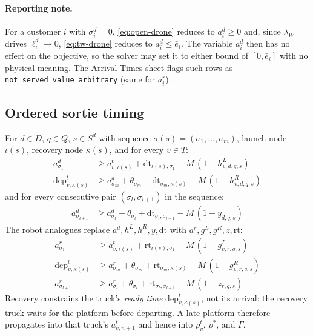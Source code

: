 \documentclass[10pt]{article}
\begin{document}
\paragraph{Reporting note.} For a customer $i$ with $\sigma^d_i=0$,
\eqref{eq:open-drone} reduces to $a^d_i\ge 0$ and, since $\lambda_W$ drives
$\ell^d_i\to 0$, \eqref{eq:tw-drone} reduces to $a^d_i\le \bar{e}_i$. The variable
$a^d_i$ then has no effect on the objective, so the solver may set it to either
bound of $[0,\bar{e}_i]$ with no physical meaning. The Arrival Times sheet flags such
rows as \texttt{not\_served\_value\_arbitrary} (same for $a^r_i$).

\subsection{Ordered sortie timing}
\label{sec:sortie-time}
For $d\in D$, $q\in Q$, $s\in S^d$ with sequence $\sigma(s)=(\sigma_1,\dots,\sigma_m)$,
launch node $\iota(s)$, recovery node $\kappa(s)$, and for every $v\in T$:
\begin{align}
a^d_{\sigma_1} &\ge a^t_{v,\iota(s)} + \mathrm{dt}_{\iota(s),\sigma_1} - M\,(1-h^L_{v,d,q,s}) \label{eq:sortie-drone-launch}\\
\mathrm{dep}^t_{v,\kappa(s)} &\ge a^d_{\sigma_m} + \theta_{\sigma_m} + \mathrm{dt}_{\sigma_m,\kappa(s)} - M\,(1-h^R_{v,d,q,s}) \label{eq:sortie-drone-recover}
\end{align}
and for every consecutive pair $(\sigma_l,\sigma_{l+1})$ in the sequence:
\begin{align}
a^d_{\sigma_{l+1}} &\ge a^d_{\sigma_l} + \theta_{\sigma_l} + \mathrm{dt}_{\sigma_l,\sigma_{l+1}} - M\,(1-y_{d,q,s}) \label{eq:sortie-drone-seq}
\end{align}
The robot analogues replace $a^d, h^L, h^R, y, \mathrm{dt}$ with $a^r, g^L, g^R, z,
\mathrm{rt}$:
\begin{align}
a^r_{\sigma_1} &\ge a^t_{v,\iota(s)} + \mathrm{rt}_{\iota(s),\sigma_1} - M\,(1-g^L_{v,r,q,s}) \label{eq:sortie-robot-launch}\\
\mathrm{dep}^t_{v,\kappa(s)} &\ge a^r_{\sigma_m} + \theta_{\sigma_m} + \mathrm{rt}_{\sigma_m,\kappa(s)} - M\,(1-g^R_{v,r,q,s}) \label{eq:sortie-robot-recover}\\
a^r_{\sigma_{l+1}} &\ge a^r_{\sigma_l} + \theta_{\sigma_l} + \mathrm{rt}_{\sigma_l,\sigma_{l+1}} - M\,(1-z_{r,q,s}) \label{eq:sortie-robot-seq}
\end{align}
\noindent Recovery constrains the truck's \emph{ready time}
$\mathrm{dep}^t_{v,\kappa(s)}$, not its arrival: the recovery truck waits for
the platform before departing. A late platform therefore propagates into that
truck's $a^t_{v,n+1}$ and hence into $\rho^t_v$, $\rho^*$, and $\Gamma$.
\end{document}
